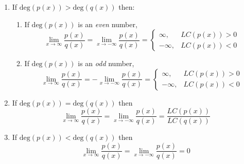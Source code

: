 \documentclass[12pt]{article}
\begin{document}
\begin{enumerate}
  \item If $\mathrm{deg}(p(x)) > \mathrm{deg}(q(x))$ then:
  \begin{enumerate}

    \item If $\mathrm{deg}(p(x))$ is an \textit{even} number, 
      \begin{equation}
        \lim_{x \rightarrow \infty} \dfrac{p(x)}{q(x)} = \lim_{x \rightarrow -\infty} \dfrac{p(x)}{q(x)} = \begin{cases} \infty, & LC(p(x)) > 0 \\ -\infty, & LC(p(x)) < 0 \end{cases}
      \end{equation}

    \item If $\mathrm{deg}(p(x))$ is an \textit{odd} number,
      \begin{equation}
        \lim_{x \rightarrow \infty} \dfrac{p(x)}{q(x)} = - \lim_{x \rightarrow -\infty} \dfrac{p(x)}{q(x)} = \begin{cases} \infty, & LC(p(x)) > 0 \\ -\infty, & LC(p(x)) < 0 \end{cases}
      \end{equation}
  \end{enumerate}

  \item If $\mathrm{deg}(p(x)) = \mathrm{deg}(q(x))$ then
  \begin{equation}
    \lim_{x \rightarrow \infty} \dfrac{p(x)}{q(x)} = \lim_{x \rightarrow -\infty} \dfrac{p(x)}{q(x)} = \dfrac{LC(p(x))}{LC(q(x))}
  \end{equation}

  \item If $\mathrm{deg}(p(x)) < \mathrm{deg}(q(x))$ then
    \begin{equation}
      \lim_{x \rightarrow \infty} \dfrac{p(x)}{q(x)} = \lim_{x \rightarrow - \infty} \dfrac{p(x)}{q(x)} = 0
    \end{equation}
\end{enumerate}


\end{document}
